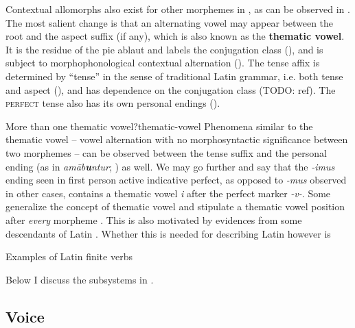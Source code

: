 \documentclass[a4paper, oneside, 12pt]{report}
\newcommand*{\citepage}[1]{p.~{#1}}
\newcommand*{\concept}[1]{\textbf{#1}}
\newcommand{\form}[1]{\emph{#1}}
\newcommand*{\category}[1]{\textsc{#1}}
\begin{document}
Contextual allomorphs also exist for other morphemes in 
\citep[\citepage{11}]{embick2005status},
as can be observed in .
The most salient change is that 
an alternating vowel may appear between the root and the aspect suffix (if any),
which is also known as the \concept{thematic vowel}.
It is the residue of the \ac{pie} ablaut
and labels the conjugation class
(),
and is subject to morphophonological contextual alternation
().
The tense affix is determined by ``tense'' in the sense of traditional Latin grammar, 
i.e. both tense and aspect (),
and has dependence on the conjugation class (TODO: ref).
The \category{perfect} tense also has its own personal endings ().

\begin{infobox}{More than one thematic vowel?}{thematic-vowel}
    Phenomena similar to the thematic vowel -- vowel alternation with no morphosyntactic significance 
    between two morphemes -- can be observed 
    between the tense suffix and the personal ending 
    (as in \form{am\={a}b\textbf{u}ntur}; ) as well.
    We may go further and say that
    the \form{-imus} ending seen in first person active indicative perfect,
    as opposed to \form{-mus} observed in other cases, 
    contains a thematic vowel \form{i} after the perfect marker \form{-v-}.
    Some generalize the concept of thematic vowel and 
    stipulate a thematic vowel position after \emph{every} morpheme
    \cite{embick2003latin}.
    This is also motivated by evidences from some descendants of Latin 
    \citep{oltra1999notion,oltra2005stress}.
    Whether this is needed for describing Latin however is 
\end{infobox}

\begin{sidewaystable}
    \centering
    \caption{Examples of Latin finite verbs}
    \label{tbl:latin-finite-verbs}
        
\end{sidewaystable}

Below I discuss the subsystems in .

\subsection{Voice}
\end{document}
